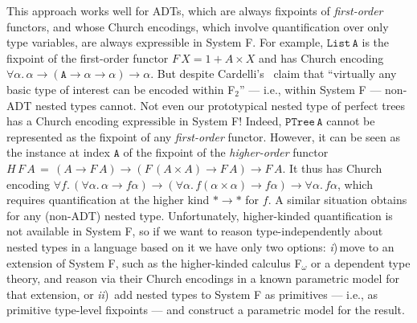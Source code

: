 \documentclass[runningheads]{llncs}
\begin{document}
This approach works well for ADTs, which are always fixpoints of {\em
  first-order} functors, and whose Church encodings, which involve
quantification over only type variables, are always expressible in
System F. For example, $\mathtt{List\,A}$ is the fixpoint of the
first-order functor $F\,X = 1 + A \times X$ and has Church encoding
$\forall \alpha. \, \alpha \to (\mathtt{A} \to \alpha \to \alpha) \to
\alpha$. But despite Cardelli's~\cite{car97} claim that ``virtually
any basic type of interest can be encoded within F$_2$'' --- i.e.,
within System F --- non-ADT nested types cannot.  Not even our
prototypical nested type of perfect trees has a Church encoding
expressible in System F!  Indeed, $\mathtt{PTree\,A}$ cannot be
represented as the fixpoint of any {\em first-order} functor. However,
it can be seen as the instance at index $\mathtt{A}$ of the fixpoint
of the {\em higher-order} functor $H\,F\,A\,=\, (A \to F\,A) \to (F
\,(A \times A) \to F\,A) \to F\,A$. It thus has Church encoding
$\forall f.\, (\forall \alpha.\,\alpha \to f\alpha) \to (\forall
\alpha. \,f (\alpha \times \alpha) \to f\alpha) \to \forall \alpha.\,
f\alpha$, which requires quantification at the higher kind $* \to *$
for $f$. A similar situation obtains for any (non-ADT) nested
type. Unfortunately, higher-kinded quantification is not available in
System F, so if we want to reason type-independently about nested
types in a language based on it we have only two options: {\em
  i})\,move to an extension of System F, such as the higher-kinded
calculus F$_\omega$ or a dependent type theory, and reason via their
Church encodings in a known parametric model for that extension, or
{\em ii})\, add nested types to System F as primitives --- i.e., as
primitive type-level fixpoints --- and construct a parametric model
for the result.
\end{document}
